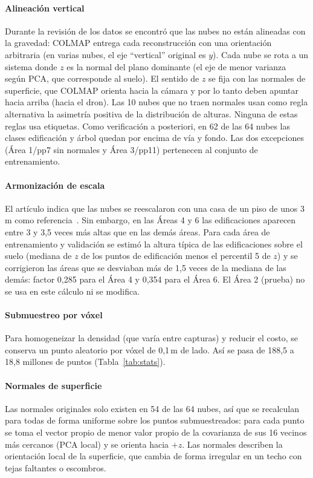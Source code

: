 \documentclass[5p]{elsarticle}
\begin{document}
\paragraph{Alineación vertical} Durante la revisión de los datos se encontró que las nubes no están alineadas con la gravedad: COLMAP entrega cada reconstrucción con una orientación arbitraria (en varias nubes, el eje ``vertical'' original es $y$). Cada nube se rota a un sistema donde $z$ es la normal del plano dominante (el eje de menor varianza según PCA, que corresponde al suelo). El sentido de $z$ se fija con las normales de superficie, que COLMAP orienta hacia la cámara y por lo tanto deben apuntar hacia arriba (hacia el dron). Las 10 nubes que no traen normales usan como regla alternativa la asimetría positiva de la distribución de alturas. Ninguna de estas reglas usa etiquetas. Como verificación a posteriori, en 62 de las 64 nubes las clases edificación y árbol quedan por encima de vía y fondo. Las dos excepciones (Área 1/pp7 sin normales y Área 3/pp11) pertenecen al conjunto de entrenamiento.

\paragraph{Armonización de escala} El artículo indica que las nubes se reescalaron con una casa de un piso de unos 3\,m como referencia~\cite{Le2026}. Sin embargo, en las Áreas 4 y 6 las edificaciones aparecen entre 3 y 3,5 veces más altas que en las demás áreas. Para cada área de entrenamiento y validación se estimó la altura típica de las edificaciones sobre el suelo (mediana de $z$ de los puntos de edificación menos el percentil 5 de $z$) y se corrigieron las áreas que se desviaban más de 1,5 veces de la mediana de las demás: factor 0,285 para el Área 4 y 0,354 para el Área 6. El Área 2 (prueba) no se usa en este cálculo ni se modifica.

\paragraph{Submuestreo por vóxel} Para homogeneizar la densidad (que varía entre capturas) y reducir el costo, se conserva un punto aleatorio por vóxel de 0,1\,m de lado. Así se pasa de 188,5 a 18,8 millones de puntos (Tabla~\ref{tab:stats}).

\paragraph{Normales de superficie} Las normales originales solo existen en 54 de las 64 nubes, así que se recalculan para todas de forma uniforme sobre los puntos submuestreados: para cada punto se toma el vector propio de menor valor propio de la covarianza de sus 16 vecinos más cercanos (PCA local) y se orienta hacia $+z$. Las normales describen la orientación local de la superficie, que cambia de forma irregular en un techo con tejas faltantes o escombros.
\end{document}
